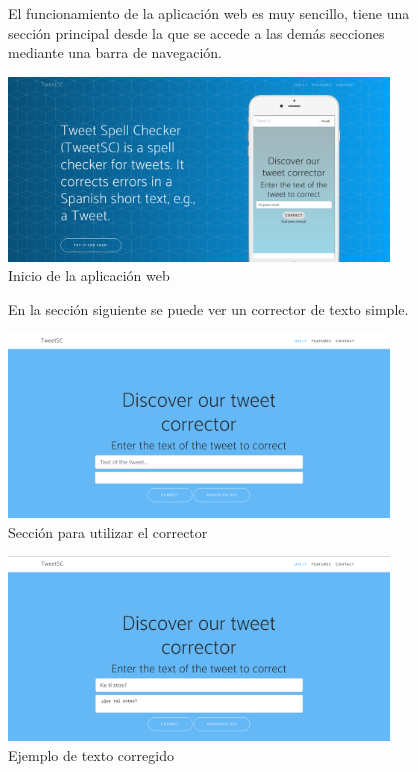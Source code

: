 \documentclass[spanish,12pt, a4paper,twoside]{paper}
\begin{document}
\begin{figure}[h]
El funcionamiento de la aplicación web es muy sencillo, tiene una sección principal desde la que se accede a las demás secciones mediante una barra de navegación.
\begin{center}
 \includegraphics[width=0.9\textwidth]{recursos/WebInicio.png}
\caption{Inicio de la aplicación web}
\label{fig:webinicio}
\end{center}
\end{figure}

\begin{figure}[h]
En la sección siguiente se puede ver un corrector de texto simple.
\begin{center}
\includegraphics[width=0.9\textwidth]{recursos/WebUseIt.png}
\caption{Sección para utilizar el corrector}
\label{fig:webuseit}
\end{center}
\end{figure}

\begin{figure}[h]
\centering
 \includegraphics[width=0.9\textwidth]{recursos/WebUseIt_Corrected.png}
\caption{Ejemplo de texto corregido}
\label{fig:webuseitcorrected}
\end{figure}
\end{document}
